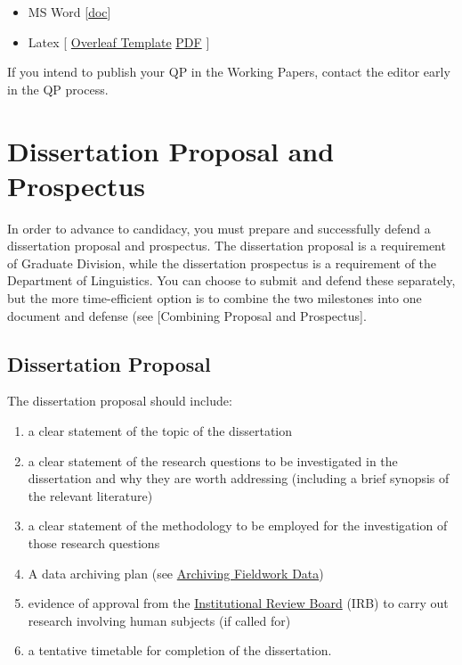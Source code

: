 \documentclass[
]{book}
\providecommand{\tightlist}{%
  \setlength{\itemsep}{0pt}\setlength{\parskip}{0pt}}
\begin{document}
\begin{itemize}
\item
  MS Word {[}\href{http://ling.hawaii.edu/wp-content/uploads/wp-guidelines-CURRENT-Dec2015.doc}{doc}{]}
\item
  Latex {[} \href{https://www.overleaf.com/read/vrzdjgmsxpxz}{Overleaf Template} \textbar{} \href{/docs/UHMWPL_latex.pdf}{PDF} {]}
\end{itemize}

If you intend to publish your QP in the Working Papers, contact the editor early in the QP process.

\hypertarget{prospectus}{%
\chapter{Dissertation Proposal and Prospectus}\label{prospectus}}

In order to advance to candidacy, you must prepare and successfully defend a dissertation proposal and prospectus.
The dissertation proposal is a requirement of Graduate Division, while the dissertation prospectus is a requirement of the Department of Linguistics. You can choose to submit and defend these separately, but the more time-efficient option is to combine the two milestones into one document and defense (see {[}Combining Proposal and Prospectus{]}.

\hypertarget{dissertation-proposal}{%
\section{Dissertation Proposal}\label{dissertation-proposal}}

The dissertation proposal should include:

\begin{enumerate}
\def\labelenumi{\arabic{enumi}.}
\tightlist
\item
  a clear statement of the topic of the dissertation
\item
  a clear statement of the research questions to be investigated in the dissertation and why they are worth addressing (including a brief synopsis of the relevant literature)
\item
  a clear statement of the methodology to be employed for the investigation of those research questions
\item
  A data archiving plan (see \protect\hyperlink{archiving}{Archiving Fieldwork Data})
\item
  evidence of approval from the \protect\hyperlink{IRB}{Institutional Review Board} (IRB) to carry out research involving human subjects (if called for)
\item
  a tentative timetable for completion of the dissertation.
\end{enumerate}
\end{document}

